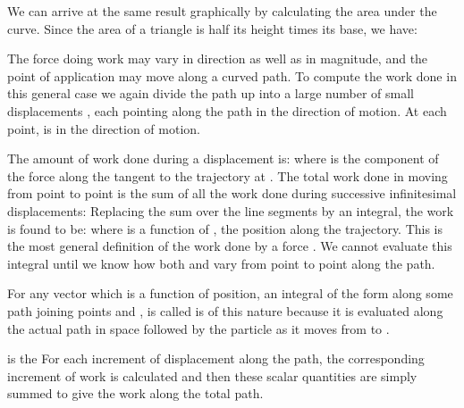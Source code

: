 {We can arrive at the same result graphically by calculating the area under
the  curve.
Since the area of a triangle is half its height times its base, we have:
%
%

The force  doing work may
vary in direction as well as in
magnitude, and the point of application may move along a curved path.
To compute the work done in this general case we again divide the path up
into a large number of small displacements , each pointing along
the path in the direction of motion.
At each point,  is in the direction of motion.

The amount of work done during a displacement  is:
%
%
where  is the component of the force along the tangent to
the trajectory at .
The total work done in moving from point  to point  is the
sum of all the work done during successive infinitesimal displacements:
%
%
Replacing the sum over the line segments by an integral, the work
is found to be:
%
%
where \m{\theta} is a function of , the position along the trajectory.
This is the most general definition of the work done by a force .
We cannot evaluate this integral until we know how both  and \m{\theta}
vary from point to point along the path.


For any vector  which is a function of position, an integral of the
form
%
%
along some path joining points  and , is called 
 is of this nature because it is evaluated along the
actual path in space followed by the particle as it moves from  to .

 is the 
For each increment of displacement  along the path, the
corresponding increment of work  is calculated
and then these scalar quantities are simply summed to give the work along
the total path.

}
